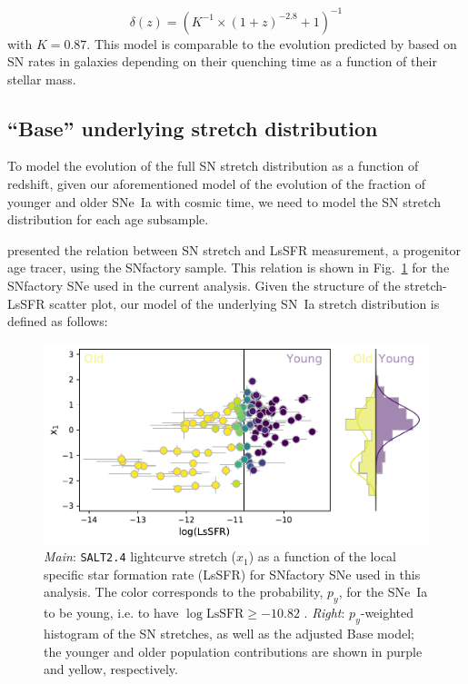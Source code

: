 \documentclass[]{aa}
\begin{document}
\begin{equation}
    \label{eq:delta}
    \delta(z) = \left( K^{-1} \times (1+z)^{-2.8} +1 \right)^{-1}
\end{equation}
with $K=0.87$. This model is comparable to the evolution predicted by
\cite{childress2014} based on SN rates in galaxies depending on their quenching
time as a function of their stellar mass.

\subsection{``Base'' underlying stretch distribution}
\label{sec:basemodel}

To model the evolution of the full SN stretch distribution as a function of
redshift, given our aforementioned model of the evolution of the fraction of
younger and older SNe~Ia with cosmic time, we need to model the SN stretch
distribution for each age subsample. 

\cite{rigault2018} presented the relation between SN stretch and LsSFR
measurement, a progenitor age tracer, using the SNfactory sample. This relation
is shown in Fig.~\ref{fig:stretchlssfr} for the SNfactory SNe used in the
current analysis. Given the structure of the stretch-LsSFR scatter plot, our
model of the underlying SN~Ia stretch distribution is defined as follows:

\begin{figure}
    \centering
    \includegraphics[width=0.8\linewidth]{Article_figures/model_base_hist.pdf}
    \caption{\textit{Main}: \textsc{\texttt{SALT2.4}} lightcurve stretch ($x_1$)
        as a function of the local specific star formation rate (LsSFR) for
        SNfactory SNe used in this analysis. The color corresponds to the
        probability, $p_y$, for the SNe~Ia to be young, i.e. to have
        $\log\mathrm{LsSFR} \geq -10.82$ \citep[see][]{rigault2018}.
        \textit{Right}: $p_y$-weighted histogram of the SN stretches, as well as
        the adjusted Base model; the younger and older population contributions
        are shown in purple and yellow, respectively.}
    \label{fig:stretchlssfr}
\end{figure}
\end{document}
